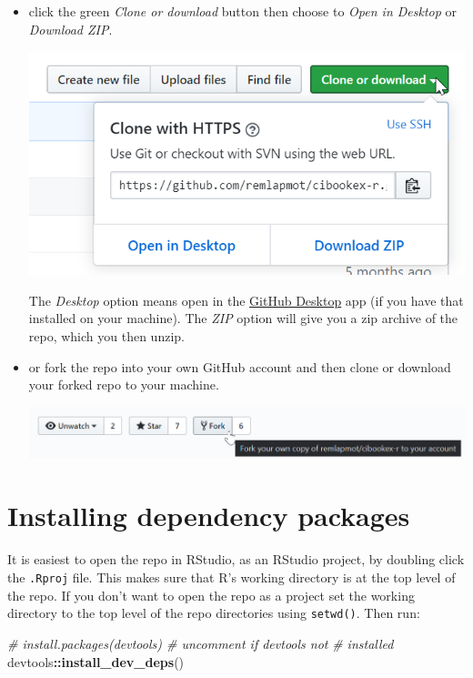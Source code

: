 \documentclass[
  10pt,
]{book}
\newenvironment{Shaded}{\begin{snugshade}}{\end{snugshade}}
\newcommand{\CommentTok}[1]{\textcolor[rgb]{0.56,0.35,0.01}{\textit{#1}}}
\newcommand{\KeywordTok}[1]{\textcolor[rgb]{0.13,0.29,0.53}{\textbf{#1}}}
\newcommand{\NormalTok}[1]{#1}
\newcommand{\OperatorTok}[1]{\textcolor[rgb]{0.81,0.36,0.00}{\textbf{#1}}}
\begin{document}
\begin{itemize}
\item
  click the green \emph{Clone or download} button then choose to \emph{Open in Desktop} or \emph{Download ZIP}.

  \begin{center}\includegraphics[width=0.65\linewidth]{figs/clone-or-download} \end{center}

  The \emph{Desktop} option means open in the \href{https://desktop.github.com/}{GitHub Desktop} app (if you have that installed on your machine). The \emph{ZIP} option will give you a zip archive of the repo, which you then unzip.
\item
  or fork the repo into your own GitHub account and then clone or download your forked repo to your machine.

  \begin{center}\includegraphics[width=0.65\linewidth]{figs/fork} \end{center}
\end{itemize}

\hypertarget{installing-dependency-packages}{%
\section{Installing dependency packages}\label{installing-dependency-packages}}

It is easiest to open the repo in RStudio, as an RStudio project, by doubling click the \texttt{.Rproj} file. This makes sure that R's working directory is at the top level of the repo. If you don't want to open the repo as a project set the working directory to the top level of the repo directories using \texttt{setwd()}. Then run:

\begin{Shaded}
\begin{Highlighting}[]
\CommentTok{\# install.packages(\textquotesingle{}devtools\textquotesingle{}) \# uncomment if devtools not}
\CommentTok{\# installed}
\NormalTok{devtools}\OperatorTok{::}\KeywordTok{install\_dev\_deps}\NormalTok{()}
\end{Highlighting}
\end{Shaded}
\end{document}
